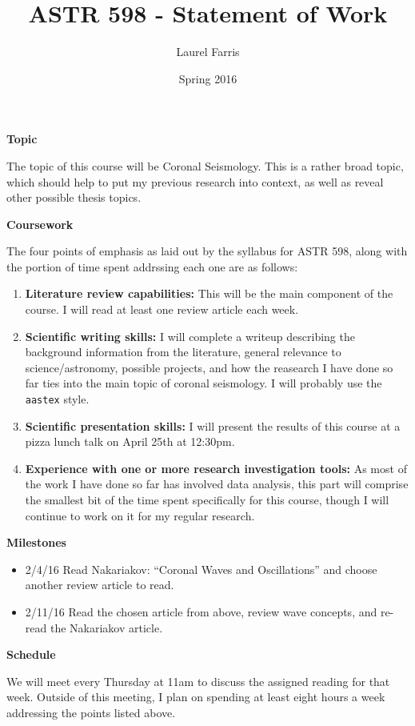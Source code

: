 \documentclass[12pt]{article}
\title{ASTR 598 - Statement of Work}
\date{Spring 2016}
\author{Laurel Farris}
\begin{document}
\maketitle

\large\textbf{Topic}\normalsize

The topic of this course will be Coronal Seismology. This is a rather
broad topic, which should help to put my previous research into context,
as well as reveal other possible thesis topics.

\large\textbf{Coursework}\normalsize

The four points of emphasis as laid out by the syllabus for ASTR
598, along with the portion of time spent addrssing each one are as follows:
\begin{enumerate}
    \item \textbf{Literature review capabilities:} This will be the main
        component of the course. I will read at least one review article
        each week.
    \item \textbf{Scientific writing skills:} I will complete a
        writeup describing the
        background information from the literature, general
        relevance to science/astronomy, possible projects, and how the
        reasearch I have done so far ties into the main topic of coronal
        seismology. I will probably use the \texttt{aastex} style.
    \item \textbf{Scientific presentation skills:} I will present the results
        of this course at a pizza lunch talk on April 25th at 12:30pm.
    \item \textbf{Experience with one or more research investigation tools:}
        As most of the work I have done so far has involved data analysis, this
        part will comprise the smallest bit of the time spent specifically for
        this course, though I will continue to work on it for my regular
        research.
\end{enumerate}

\large\textbf{Milestones}\normalsize

\begin{itemize}
    \item 2/4/16 Read Nakariakov: ``Coronal Waves and Oscillations'' and
        choose another review article to read.
    \item 2/11/16 Read the chosen article from above, review wave concepts,
        and re-read the Nakariakov article.
\end{itemize}

\large\textbf{Schedule}\normalsize

We will meet every Thursday at 11am to discuss the assigned reading
for that week. Outside of this meeting, I plan on spending at least eight
hours a week addressing the points listed above.
\end{document}
